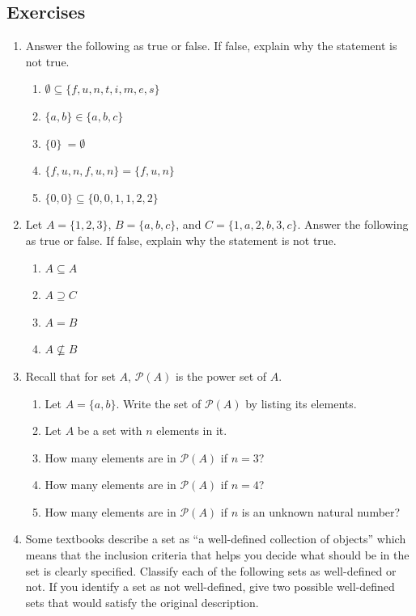 \documentclass[
]{book}
\theoremstyle{definition}
\theoremstyle{definition}
\theoremstyle{definition}
\theoremstyle{remark}
\begin{document}
\hypertarget{exercises-3}{%
\subsection{Exercises}\label{exercises-3}}

\begin{enumerate}
\def\labelenumi{\arabic{enumi}.}
\item
  Answer the following as true or false. If false, explain why the statement is not true.

  \begin{enumerate}
  \def\labelenumii{\alph{enumii}.}
  \item
    \(\emptyset \subseteq \{f,u,n,t,i,m,e,s\}\)
  \item
    \(\{a,b\} \in \{a,b,c\}\)
  \item
    \(\{0 \}\ = \emptyset\)
  \item
    \(\{f,u,n,f,u,n \}=\{f,u,n \}\)
  \item
    \(\{0,0\} \subseteq \{0,0,1,1,2,2\}\)
  \end{enumerate}
\item
  Let \(A=\{1, 2, 3\}\), \(B=\{a, b, c\}\), and \(C=\{1, a, 2, b, 3, c\}\). Answer the following as true or false. If false, explain why the statement is not true.

  \begin{enumerate}
  \def\labelenumii{\alph{enumii})}
  \item
    \(A \subseteq A\)
  \item
    \(A\supseteq C\)
  \item
    \(A=B\)
  \item
    \(A \nsubseteq B\)
  \end{enumerate}
\item
  Recall that for set \(A\), \(\mathcal{P}(A)\) is the power set of \(A\).

  \begin{enumerate}
  \def\labelenumii{\alph{enumii})}
  \item
    Let \(A=\{a,b\}\). Write the set of \(\mathcal{P}(A)\) by listing its elements.
  \item
    Let \(A\) be a set with \(n\) elements in it.
  \item
    How many elements are in \(\mathcal{P}(A)\) if \(n=3\)?
  \item
    How many elements are in \(\mathcal{P}(A)\) if \(n=4\)?
  \item
    How many elements are in \(\mathcal{P}(A)\) if \(n\) is an unknown natural number?
  \end{enumerate}
\item
  Some textbooks describe a set as ``a well-defined collection of objects'' which means that the inclusion criteria that helps you decide what should be in the set is clearly specified. Classify each of the following sets as well-defined or not. If you identify a set as not well-defined, give two possible well-defined sets that would satisfy the original description.


\end{enumerate}
\end{document}
